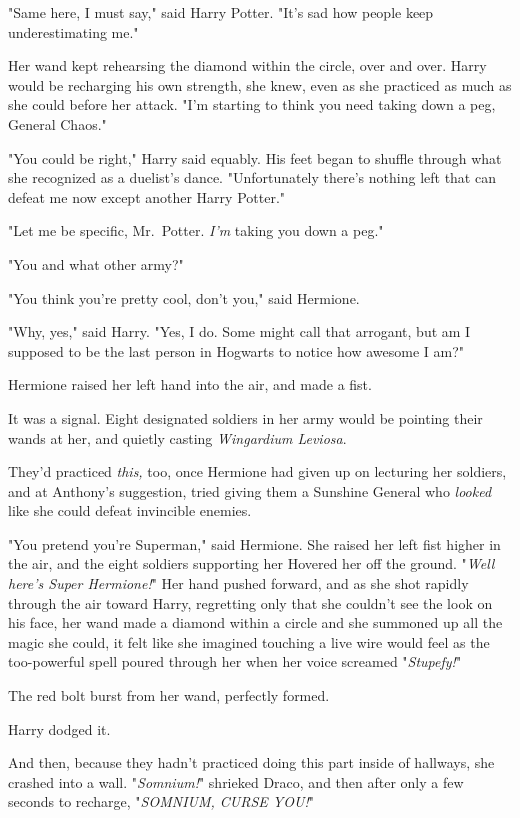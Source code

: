 "Same here, I must say," said Harry Potter. "It's sad how people keep
underestimating me."

Her wand kept rehearsing the diamond within the circle, over and over. Harry
would be recharging his own strength, she knew, even as she practiced as much
as she could before her attack. "I'm starting to think you need taking down a
peg, General Chaos."

"You could be right," Harry said equably. His feet began to shuffle through
what she recognized as a duelist's dance. "Unfortunately there's nothing left
that can defeat me now except another Harry Potter."

"Let me be specific, Mr.~Potter. \emph{I'm} taking you down a peg."

"You and what other army?"

"You think you're pretty cool, don't you," said Hermione.

"Why, yes," said Harry. "Yes, I do. Some might call that arrogant, but am I
supposed to be the last person in Hogwarts to notice how awesome I am?"

Hermione raised her left hand into the air, and made a fist.

It was a signal. Eight designated soldiers in her army would be pointing their
wands at her, and quietly casting \emph{Wingardium Leviosa}.

They'd practiced \emph{this,} too, once Hermione had given up on lecturing her
soldiers, and at Anthony's suggestion, tried giving them a Sunshine General who
\emph{looked} like she could defeat invincible enemies.

"You pretend you're Superman," said Hermione. She raised her left fist higher
in the air, and the eight soldiers supporting her Hovered her off the ground.
"\emph{Well here's Super Hermione!}" Her hand pushed forward, and as she shot
rapidly through the air toward Harry, regretting only that she couldn't see the
look on his face, her wand made a diamond within a circle and she summoned up
all the magic she could, it felt like she imagined touching a live wire would
feel as the too-powerful spell poured through her when her voice screamed
"\emph{Stupefy!}"

The red bolt burst from her wand, perfectly formed.

Harry dodged it.

And then, because they hadn't practiced doing this part inside of hallways, she
crashed into a wall.
\sbreak
"\emph{Somnium!}" shrieked Draco, and then after only a few seconds to
recharge, "\emph{SOMNIUM, CURSE YOU!}"

